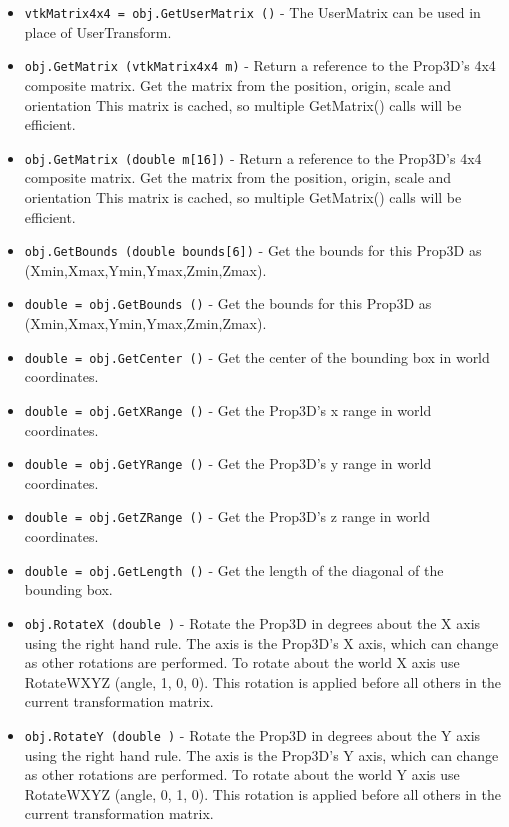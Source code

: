 \begin{itemize}
\item  \verb|vtkMatrix4x4 = obj.GetUserMatrix ()| -  The UserMatrix can be used in place of UserTransform.

\item  \verb|obj.GetMatrix (vtkMatrix4x4 m)| -  Return a reference to the Prop3D's 4x4 composite matrix.
 Get the matrix from the position, origin, scale and orientation This
 matrix is cached, so multiple GetMatrix() calls will be efficient.

\item  \verb|obj.GetMatrix (double m[16])| -  Return a reference to the Prop3D's 4x4 composite matrix.
 Get the matrix from the position, origin, scale and orientation This
 matrix is cached, so multiple GetMatrix() calls will be efficient.

\item  \verb|obj.GetBounds (double bounds[6])| -  Get the bounds for this Prop3D as (Xmin,Xmax,Ymin,Ymax,Zmin,Zmax).

\item  \verb|double = obj.GetBounds ()| -  Get the bounds for this Prop3D as (Xmin,Xmax,Ymin,Ymax,Zmin,Zmax).

\item  \verb|double = obj.GetCenter ()| -  Get the center of the bounding box in world coordinates.

\item  \verb|double = obj.GetXRange ()| -  Get the Prop3D's x range in world coordinates.

\item  \verb|double = obj.GetYRange ()| -  Get the Prop3D's y range in world coordinates.

\item  \verb|double = obj.GetZRange ()| -  Get the Prop3D's z range in world coordinates.

\item  \verb|double = obj.GetLength ()| -  Get the length of the diagonal of the bounding box.

\item  \verb|obj.RotateX (double )| -  Rotate the Prop3D in degrees about the X axis using the right hand
 rule. The axis is the Prop3D's X axis, which can change as other
 rotations are performed.  To rotate about the world X axis use
 RotateWXYZ (angle, 1, 0, 0). This rotation is applied before all
 others in the current transformation matrix.

\item  \verb|obj.RotateY (double )| -  Rotate the Prop3D in degrees about the Y axis using the right hand
 rule. The axis is the Prop3D's Y axis, which can change as other
 rotations are performed.  To rotate about the world Y axis use
 RotateWXYZ (angle, 0, 1, 0). This rotation is applied before all
 others in the current transformation matrix.


\end{itemize}
